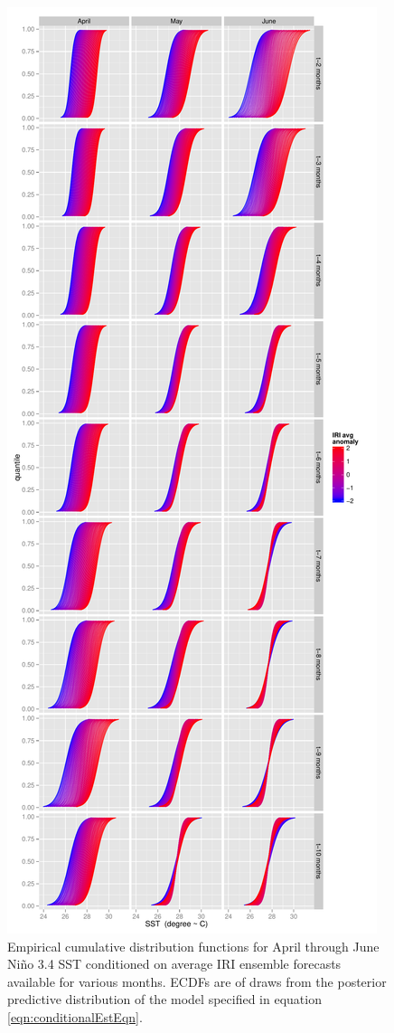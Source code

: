 \documentclass[authoryear]{article}
\begin{document}
\begin{figure}[!htbp]
  \includegraphics[width=\linewidth]{Pricingfigs/conditionalCDFs04to06TraditionalCDFconfig}
  \caption{Empirical cumulative distribution functions for April through June Ni\~no 3.4 SST conditioned on average IRI ensemble forecasts available for various months. ECDFs are of draws from the posterior predictive distribution of the model specified in equation \ref{eqn:conditionalEstEqn}.}
   \label{fig:conditionalCDFs04to06}
\end{figure}
\end{document}
